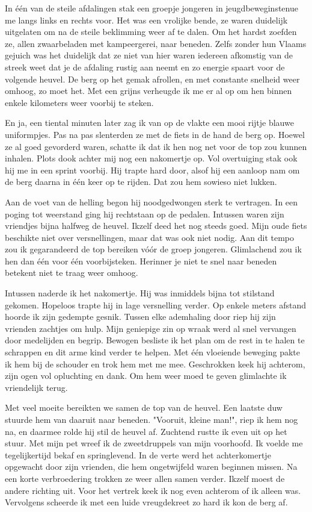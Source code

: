 \documentclass[12pt, justified, a4paper, symmetric]{tufte-book}
\begin{document}
In één van de steile afdalingen stak een groepje jongeren in jeugdbeweginstenue me langs links en rechts voor. Het was een vrolijke bende, ze waren duidelijk uitgelaten om na de steile beklimming weer af te dalen. Om het hardst zoefden ze, allen zwaarbeladen met kampeergerei, naar beneden. Zelfs zonder hun Vlaams gejuich was het duidelijk dat ze niet van hier waren  iedereen afkomstig van de streek weet dat je de afdaling rustig aan neemt en zo energie spaart voor de volgende heuvel. De berg op het gemak afrollen, en met constante snelheid weer omhoog, zo moet het. Met een grijns verheugde ik me er al op om hen binnen enkele kilometers weer voorbij te steken.

En ja, een tiental minuten later zag ik van op de vlakte een mooi rijtje blauwe uniformpjes. Pas na pas slenterden ze met de fiets in de hand de berg op. Hoewel ze al goed gevorderd waren, schatte ik dat ik hen nog net voor de top zou kunnen inhalen. Plots dook achter mij nog een nakomertje op. Vol overtuiging stak ook hij me in een sprint voorbij. Hij trapte hard door, alsof hij een aanloop nam om de berg daarna in \'e\'en keer op te rijden. Dat zou hem sowieso niet lukken.

Aan de voet van de helling begon hij noodgedwongen sterk te vertragen. In een poging tot weerstand ging hij rechtstaan op de pedalen. Intussen waren zijn vriendjes bijna halfweg de heuvel. Ikzelf deed het nog steeds goed. Mijn oude fiets beschikte niet over versnellingen, maar dat was ook niet nodig. Aan dit tempo zou ik gegarandeerd de top bereiken v\'o\'or de groep jongeren. Glimlachend zou ik hen dan \'e\'en voor \'e\'en voorbijsteken. Herinner je  niet te snel naar beneden betekent niet te traag weer omhoog.

Intussen naderde ik het nakomertje. Hij was inmiddels bijna tot stilstand gekomen. Hopeloos trapte hij in lage versnelling verder. Op enkele meters afstand hoorde ik zijn gedempte gesnik. Tussen elke ademhaling door riep hij zijn vrienden zachtjes om hulp. Mijn geniepige zin op wraak werd al snel vervangen door medelijden en begrip. Bewogen besliste ik het plan om de rest in te halen te schrappen en dit arme kind verder te helpen. Met \'e\'en vloeiende beweging pakte ik hem bij de schouder en trok hem met me mee. Geschrokken keek hij achterom, zijn ogen vol opluchting en dank. Om hem weer moed te geven glimlachte ik vriendelijk terug.

Met veel moeite bereikten we samen de top van de heuvel. Een laatste duw stuurde hem van daaruit naar beneden. "Vooruit, kleine man!", riep ik hem nog na, en daarmee rolde hij stil de heuvel af. Zuchtend rustte ik even uit op het stuur. Met mijn pet wreef ik de zweetdruppels van mijn voorhoofd. Ik voelde me tegelijkertijd bekaf en springlevend. In de verte werd het achterkomertje opgewacht door zijn vrienden, die hem ongetwijfeld waren beginnen missen. Na een korte verbroedering trokken ze weer allen samen verder. Ikzelf moest de andere richting uit. Voor het vertrek keek ik nog even achterom of ik alleen was. Vervolgens scheerde ik met een luide vreugdekreet zo hard ik kon de berg af.
\end{document}
